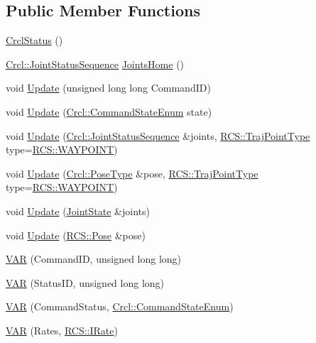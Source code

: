 \subsection*{Public Member Functions}
\begin{DoxyCompactItemize}
\item 
\hyperlink{structCrcl_1_1CrclStatus_a1cd41778adfbcbf93acf69b4696ca690}{Crcl\-Status} ()
\item 
\hyperlink{namespaceCrcl_a8e2d423195eeffb85b45b63f595f2825}{Crcl\-::\-Joint\-Status\-Sequence} \hyperlink{structCrcl_1_1CrclStatus_ad7e716027dc6c885675ff2016f36786b}{Joints\-Home} ()
\item 
void \hyperlink{structCrcl_1_1CrclStatus_a50e2821837a7a50b50df2260435f9917}{Update} (unsigned long long Command\-I\-D)
\item 
void \hyperlink{structCrcl_1_1CrclStatus_a6aa15c7d9c21c17cc591a141a52bae15}{Update} (\hyperlink{namespaceCrcl_a5b3aa14f2f4ed63cc67ecba8eaab5c93}{Crcl\-::\-Command\-State\-Enum} state)
\item 
void \hyperlink{structCrcl_1_1CrclStatus_a86850bfee0203804c2cf8fd9e89ed33f}{Update} (\hyperlink{namespaceCrcl_a8e2d423195eeffb85b45b63f595f2825}{Crcl\-::\-Joint\-Status\-Sequence} \&joints, \hyperlink{namespaceRCS_ae705dbb4b887b18fef40316b6d5ca2c9}{R\-C\-S\-::\-Traj\-Point\-Type} type=\hyperlink{namespaceRCS_ae705dbb4b887b18fef40316b6d5ca2c9a255760a7e92a5d130681fc75e280cb61}{R\-C\-S\-::\-W\-A\-Y\-P\-O\-I\-N\-T})
\item 
void \hyperlink{structCrcl_1_1CrclStatus_ad538ccbf9fe6448b9c97c5ae79d6f818}{Update} (\hyperlink{namespaceCrcl_acc6c82b52280f4d0e74b82a92400956e}{Crcl\-::\-Pose\-Type} \&pose, \hyperlink{namespaceRCS_ae705dbb4b887b18fef40316b6d5ca2c9}{R\-C\-S\-::\-Traj\-Point\-Type} type=\hyperlink{namespaceRCS_ae705dbb4b887b18fef40316b6d5ca2c9a255760a7e92a5d130681fc75e280cb61}{R\-C\-S\-::\-W\-A\-Y\-P\-O\-I\-N\-T})
\item 
void \hyperlink{structCrcl_1_1CrclStatus_a626f981943a5d9a358b3394997dd8530}{Update} (\hyperlink{RCS_8h_aa4adb93a26caa4dacba9c9614e283245}{Joint\-State} \&joints)
\item 
void \hyperlink{structCrcl_1_1CrclStatus_abb90bfc3db1819f29fd23e7920610a42}{Update} (\hyperlink{namespaceRCS_aa07e45d8a50e30064283d2b38087f999}{R\-C\-S\-::\-Pose} \&pose)
\item 
\hyperlink{structCrcl_1_1CrclStatus_a4051bdc6200a904e5c892968e42a43d6}{V\-A\-R} (Command\-I\-D, unsigned long long)
\item 
\hyperlink{structCrcl_1_1CrclStatus_a04deac202f412e0087fd07f09ccec5b7}{V\-A\-R} (Status\-I\-D, unsigned long long)
\item 
\hyperlink{structCrcl_1_1CrclStatus_a29a7ab97f492696b8a83be8762b0afda}{V\-A\-R} (Command\-Status, \hyperlink{namespaceCrcl_a5b3aa14f2f4ed63cc67ecba8eaab5c93}{Crcl\-::\-Command\-State\-Enum})
\item 
\hyperlink{structCrcl_1_1CrclStatus_a2162dbecfd7f9a01f5f92e0746e8dbfe}{V\-A\-R} (Rates, \hyperlink{classRCS_1_1IRate}{R\-C\-S\-::\-I\-Rate})
\end{DoxyCompactItemize}
